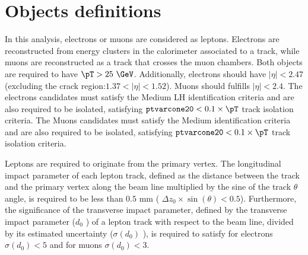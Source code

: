 
\section{Objects definitions}
\label{sec:objects}

In this analysis, electrons or muons are considered as leptons. Electrons are reconstructed from energy clusters in the calorimeter associated to a track, while muons are reconstructed as a track that crosses the muon chambers. Both objects are required to have $\pT>25~\GeV$. Additionally, electrons should have $|\eta|<2.47$ (excluding the crack region:$1.37<|\eta|<1.52$). Muons should fulfills $|\eta|<2.4$.
The electrons candidates must satisfy the Medium LH identification criteria and are also required to be isolated, satisfying $\texttt{ptvarcone20}<0.1\times \pT$ track isolation criteria.
 The Muons candidates  must satisfy the Medium identification criteria and are also required to be isolated, satisfying $\texttt{ptvarcone20}<0.1\times \pT$ track isolation criteria.

Leptons are required to originate from the primary vertex. The longitudinal impact parameter of each lepton track, defined as the distance between the track and the primary vertex along the beam line multiplied by the sine of the track $\theta$ angle, is required to be less than $0.5$ mm ( $\Delta z_{0}\times \sin(\theta) <0.5$). Furthermore, the significance of the
transverse impact parameter, defined by the transverse impact parameter ($d_{0}$ ) of a lepton track with respect
to the beam line, divided by its estimated uncertainty ($\sigma(d_{0})$ ), is required to satisfy for electrons  $\sigma(d_{0}) < 5$ and for muons  $\sigma(d_{0}) < 3$.


